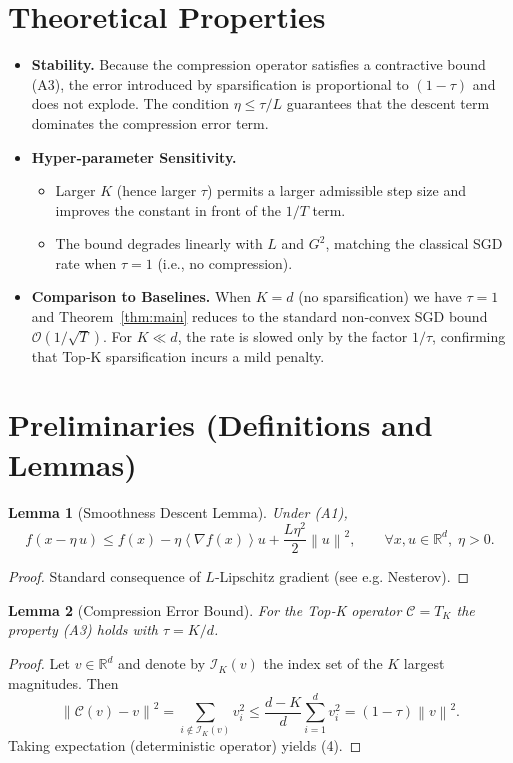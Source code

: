 \documentclass{article}
\newtheorem{lemma}{Lemma}
\newcommand{\R}{\mathbb{R}}
\newcommand{\norm}[1]{\left\|#1\right\|}
\newcommand{\inner}[1]{\left\langle #1 \right\rangle}
\begin{document}
\section*{Theoretical Properties}
\begin{itemize}
\item \textbf{Stability.} Because the compression operator satisfies a contractive bound (A3), the error introduced by sparsification is proportional to $(1-\tau)$ and does not explode. The condition $\eta\le\tau/L$ guarantees that the descent term dominates the compression error term.

\item \textbf{Hyper‑parameter Sensitivity.}
    \begin{itemize}
        \item Larger $K$ (hence larger $\tau$) permits a larger admissible step size and improves the constant in front of the $1/T$ term.
        \item The bound degrades linearly with $L$ and $G^{2}$, matching the classical SGD rate when $\tau=1$ (i.e., no compression).
    \end{itemize}
\item \textbf{Comparison to Baselines.} When $K=d$ (no sparsification) we have $\tau=1$ and Theorem~\ref{thm:main} reduces to the standard non‑convex SGD bound $\mathcal{O}(1/\sqrt{T})$. For $K\ll d$, the rate is slowed only by the factor $1/\tau$, confirming that Top‑K sparsification incurs a mild penalty.
\end{itemize}

\section*{Preliminaries (Definitions and Lemmas)}
\begin{lemma}[Smoothness Descent Lemma]
Under (A1),
\[
f(x-\eta\,u)\le f(x)-\eta\inner{\nabla f(x)}{u}
+\frac{L\eta^{2}}{2}\norm{u}^{2},
\qquad\forall x,u\in\R^{d},\;\eta>0.
\tag{3}
\]
\end{lemma}
\begin{proof}
Standard consequence of $L$‑Lipschitz gradient (see e.g. Nesterov). \qedhere
\end{proof}

\begin{lemma}[Compression Error Bound]
For the Top‑K operator $\mathcal{C}=T_{K}$ the property (A3) holds with $\tau=K/d$.
\end{lemma}
\begin{proof}
Let $v\in\R^{d}$ and denote by $\mathcal{I}_{K}(v)$ the index set of the $K$ largest magnitudes.
Then
\[
\norm{\mathcal{C}(v)-v}^{2}
= \sum_{i\notin\mathcal{I}_{K}(v)} v_{i}^{2}
\le \frac{d-K}{d}\sum_{i=1}^{d}v_{i}^{2}
=(1-\tau)\norm{v}^{2}.
\]
Taking expectation (deterministic operator) yields (4). \qedhere
\end{proof}
\end{document}
